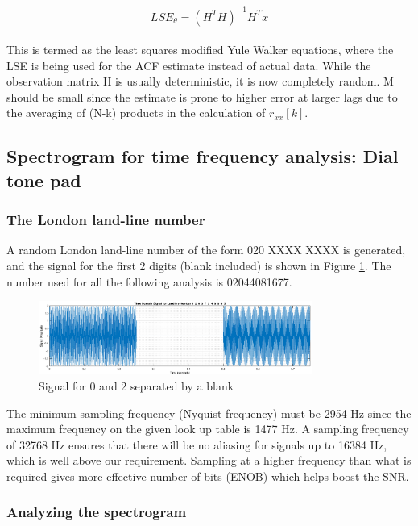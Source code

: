 \documentclass{article}
\begin{document}
\begin{equation}
LSE_{\theta} = (H^TH)^{-1}H^Tx
\end{equation}
\\
This is termed as the least squares modified Yule Walker equations, where the LSE is being used for the ACF estimate instead of actual data. While the observation matrix H is usually deterministic, it is now completely random. M should be small since the estimate is prone to higher error at larger lags due to the averaging of (N-k) products in the calculation of $r_{xx}[k]$.

\pagebreak %


\subsection{Spectrogram for time frequency analysis: Dial tone pad}

\subsubsection{The London land-line number}

A random London land-line number of the form 020 XXXX XXXX is generated, and the signal for the first 2 digits (blank included) is shown in Figure \ref{fig:dtp_2dig}. The number used for all the following analysis is 02044081677.

\begin{figure}[h!]
\centering
\includegraphics[width= 0.8\textwidth]{dtp_2dig}
\caption{\label{fig:dtp_2dig} Signal for 0 and 2 separated by a blank}
\end{figure}

The minimum sampling frequency (Nyquist frequency) must be 2954 Hz since the maximum frequency on the given look up table is 1477 Hz. A sampling frequency of 32768 Hz ensures that there will be no aliasing for signals up to 16384 Hz, which is well above our requirement. Sampling at a higher frequency than what is required gives more effective number of bits (ENOB) which helps boost the SNR.

\subsubsection{Analyzing the spectrogram}
\end{document}
